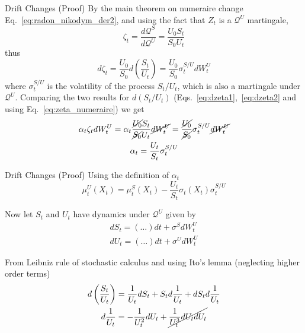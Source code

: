 \documentclass{beamer}
\begin{document}
\begin{frame}{Drift Changes (Proof)}
	By the main theorem on numeraire change Eq.~\ref{eq:radon_nikodym_der2}, and using the fact that $Z_t$ is a $\mathcal{Q}^U$ martingale, 
	\begin{equation}
	\zeta_t = \frac{d\mathcal{Q}^S}{d\mathcal{Q}^U} = \frac{U_0S_t}{S_0U_t}
	\label{eq:zeta_numeraire}
	\end{equation}
	thus
	\begin{equation}
	d\zeta_t= \frac{U_0}{S_0}d\left(\frac{S_t}{U_t}\right)= \frac{U_0}{S_0}\sigma_t^{S/U}dW_t^U
	\label{eq:dzeta2}
	\end{equation}
	where $\sigma^{S/U}_t$ is the volatility of the process $S_t/U_t$, which is also a martingale under $\mathcal{Q}^U$. Comparing the two results for $d(S_t/U_t)$ (Eqs.~\ref{eq:dzeta1},~\ref{eq:dzeta2} and using Eq.~\ref{eq:zeta_numeraire}) we get
	\begin{equation}
		\begin{gathered}
		\alpha_t\zeta_tdW_t^U = \alpha_t\frac{\cancel{U_0}S_t}{\cancel{S_0}U_t}\cancel{dW_t^U}=	\frac{\cancel{U_0}}{\cancel{S_0}}\sigma^{S/U}_t\cancel{dW_t^U} \\
		\alpha_t = \frac{U_t}{S_t}\sigma^{S/U}_t
		\end{gathered}
	\end{equation}
\end{frame}

\begin{frame}{Drift Changes (Proof)}
	Using the definition of $\alpha_t$
	\begin{equation}
	\mu_t^U(X_t)=\mu_t^S(X_t)-\frac{U_t}{S_t}\sigma_t(X_t)\sigma^{S/U}_t
	\label{eq:alpha}
	\end{equation}
	
	Now let $S_t$ and $U_t$ have dynamics under $\mathcal{Q}^U$ given by 
	\begin{equation*}
		\begin{gathered}
			dS_t = (\ldots) dt + \sigma^S dW^U_t\\
			dU_t = (\ldots) dt + \sigma^U dW^U_t 
		\end{gathered}
	\end{equation*}
	
	From Leibniz rule of stochastic calculus and using Ito's lemma (neglecting higher order terms)
	\begin{equation*}
		\begin{gathered}
		d\left(\frac{S_t}{U_t}\right)=\frac{1}{U_t}dS_t+S_td\frac{1}{U_t}+dS_td\frac{1}{U_t} \\
		d\frac{1}{U_t}=-\frac{1}{U^2_t}dU_t+\cancel{\frac{1}{U^3_t}dU_tdU_t}
		\end{gathered}
	\end{equation*}
\end{frame}
\end{document}
